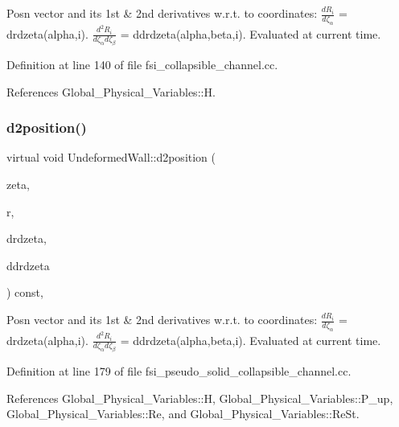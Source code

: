 Posn vector and its 1st \& 2nd derivatives w.\+r.\+t. to coordinates\+: $ \frac{dR_i}{d \zeta_\alpha}$ = drdzeta(alpha,i). $ \frac{d^2R_i}{d \zeta_\alpha d \zeta_\beta}$ = ddrdzeta(alpha,beta,i). Evaluated at current time. 



Definition at line 140 of file fsi\+\_\+collapsible\+\_\+channel.\+cc.



References Global\+\_\+\+Physical\+\_\+\+Variables\+::H.

\mbox{\label{classUndeformedWall_a709e65fc95e9443a886125e455595e5d}} 
\subsubsection{\texorpdfstring{d2position()}{d2position()}\hspace{0.1cm}{\footnotesize\ttfamily [3/4]}}
{\footnotesize\ttfamily virtual void Undeformed\+Wall\+::d2position (\begin{DoxyParamCaption}\item[{const Vector$<$ double $>$ \&}]{zeta,  }\item[{Vector$<$ double $>$ \&}]{r,  }\item[{Dense\+Matrix$<$ double $>$ \&}]{drdzeta,  }\item[{Rank\+Three\+Tensor$<$ double $>$ \&}]{ddrdzeta }\end{DoxyParamCaption}) const\hspace{0.3cm}{\ttfamily [inline]}, {\ttfamily [virtual]}}



Posn vector and its 1st \& 2nd derivatives w.\+r.\+t. to coordinates\+: $ \frac{dR_i}{d \zeta_\alpha}$ = drdzeta(alpha,i). $ \frac{d^2R_i}{d \zeta_\alpha d \zeta_\beta}$ = ddrdzeta(alpha,beta,i). Evaluated at current time. 



Definition at line 179 of file fsi\+\_\+pseudo\+\_\+solid\+\_\+collapsible\+\_\+channel.\+cc.



References Global\+\_\+\+Physical\+\_\+\+Variables\+::H, Global\+\_\+\+Physical\+\_\+\+Variables\+::\+P\+\_\+up, Global\+\_\+\+Physical\+\_\+\+Variables\+::\+Re, and Global\+\_\+\+Physical\+\_\+\+Variables\+::\+Re\+St.

